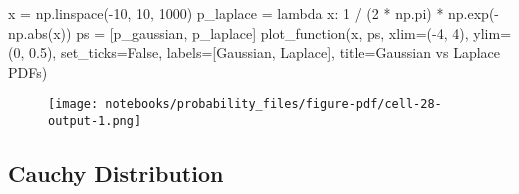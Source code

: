 \documentclass[
  letterpaper,
  DIV=11,
  numbers=noendperiod]{scrreprt}
\newenvironment{Shaded}{\begin{snugshade}}{\end{snugshade}}
\newcommand{\BuiltInTok}[1]{\textcolor[rgb]{0.00,0.23,0.31}{#1}}
\newcommand{\DecValTok}[1]{\textcolor[rgb]{0.68,0.00,0.00}{#1}}
\newcommand{\FloatTok}[1]{\textcolor[rgb]{0.68,0.00,0.00}{#1}}
\newcommand{\KeywordTok}[1]{\textcolor[rgb]{0.00,0.23,0.31}{#1}}
\newcommand{\NormalTok}[1]{\textcolor[rgb]{0.00,0.23,0.31}{#1}}
\newcommand{\OperatorTok}[1]{\textcolor[rgb]{0.37,0.37,0.37}{#1}}
\newcommand{\StringTok}[1]{\textcolor[rgb]{0.13,0.47,0.30}{#1}}
\newcommand{\VariableTok}[1]{\textcolor[rgb]{0.07,0.07,0.07}{#1}}
\begin{document}
\begin{Shaded}
\begin{Highlighting}[]
\NormalTok{x }\OperatorTok{=}\NormalTok{ np.linspace(}\OperatorTok{{-}}\DecValTok{10}\NormalTok{, }\DecValTok{10}\NormalTok{, }\DecValTok{1000}\NormalTok{)}
\NormalTok{p\_laplace }\OperatorTok{=} \KeywordTok{lambda}\NormalTok{ x: }\DecValTok{1} \OperatorTok{/}\NormalTok{ (}\DecValTok{2} \OperatorTok{*}\NormalTok{ np.pi) }\OperatorTok{*}\NormalTok{ np.exp(}\OperatorTok{{-}}\NormalTok{np.}\BuiltInTok{abs}\NormalTok{(x))}
\NormalTok{ps }\OperatorTok{=}\NormalTok{ [p\_gaussian, p\_laplace]}
\NormalTok{plot\_function(x, ps, xlim}\OperatorTok{=}\NormalTok{(}\OperatorTok{{-}}\DecValTok{4}\NormalTok{, }\DecValTok{4}\NormalTok{), ylim}\OperatorTok{=}\NormalTok{(}\DecValTok{0}\NormalTok{, }\FloatTok{0.5}\NormalTok{), set\_ticks}\OperatorTok{=}\VariableTok{False}\NormalTok{, labels}\OperatorTok{=}\NormalTok{[}\StringTok{\textquotesingle{}Gaussian\textquotesingle{}}\NormalTok{, }\StringTok{\textquotesingle{}Laplace\textquotesingle{}}\NormalTok{],}
\NormalTok{             title}\OperatorTok{=}\StringTok{\textquotesingle{}Gaussian vs Laplace PDFs\textquotesingle{}}\NormalTok{)}
\end{Highlighting}
\end{Shaded}

\begin{figure}[H]

{\centering \texttt{[image: notebooks/probability\_files/figure-pdf/cell-28-output-1.png]}

}

\end{figure}

\hypertarget{cauchy-distribution}{%
\subsection{Cauchy Distribution}\label{cauchy-distribution}}
\end{document}
